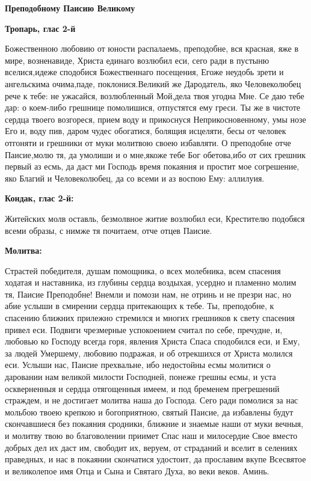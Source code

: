 \mychapterending

 


\bfseries Преподобному Паисию Великому\normalfont{}


\medskip


\bfseries Тропарь, глас 2-й\normalfont{}


Божественною любовию от юности распалаемь, преподобне, вся красная, яже в мире, возненавиде, Христа единаго возлюбил еси, сего ради в пустыню вселися,идеже сподобися Божественнаго посещения, Егоже неудобь зрети и ангельскима очима,паде, поклонися.Великий же Дародатель, яко Человеко­любец рече к тебе: не ужасайся, возлюб­ленный Мой,дела твоя угодна Мне. Се даю тебе дар: о коем-либо грешнице помолишися, отпустятся ему греси. Ты же в чистоте сердца твоего возгореся, прием воду и прикоснуся Неприкосно­венному, умы нозе Его и, воду пив, да­ром чудес обогатися, болящия исцеляти, бесы от человек отгоняти и грешни­ки от муки молитвою своею избавляти. О преподобне отче Паисие,молю тя, да умолиши и о мне,якоже тебе Бог обетова,ибо от сих грешник первый аз есмь, да даст ми Господь время покаяния и простит мое согрешение, яко Благий и Человеколюбец, да со всеми и аз воспою Ему: аллилуия.


\medskip


\bfseries Кондак, глас 2-й:\normalfont{}


Житейских молв оставль, безмолвное житие возлюбил еси, Крестителю подобяся всеми образы, с нимже тя почитаем, отче отцев Паисие.


\medskip


\bfseries Молитва:\normalfont{}


Страстей победителя, душам помощника, о всех молебника, всем спасения ходатая и наставника, из глубины сердца воздыхая, усердно и пламенно молим тя, Паисие Преподобне! Внемли и помози нам, не отринь и не презри нас, но абие услыши в смирении сердца притекающих к тебе. Ты, преподобне, к спасению ближних прилежно стремился и многих грешников к свету спасения привел еси. Подвиги чрезмерные успокоением считал по себе, пречудне, и, любовью ко Господу всегда горя, явления Христа Спаса сподобился еси, и Ему, за людей Умершему, любовию подражая, и об отрекшихся от Христа молился еси. Услыши нас, Паисие прехвальне, ибо недостойны есмы молитися о даровании нам великой милости Господней, понеже грешны есмы, и уста оскверненныя и сердца отягощенныя имеем, и под бременем прегрешений страждем, и не достигает молитва наша до Господа. Сего ради помолися за нас мольбою твоею крепкою и богоприятною, святый Паисие, да избавлены будут скончавшиеся без покаяния сродники, ближние и знаемые наши от муки вечныя, и молитву твою во благоволении приимет Спас наш и милосердие Свое вместо добрых дел их даст им, свободит их, веруем, от страданий и вселит в селениях праведных, и нас в покаянии скончатися удостоит, да прославим вкупе Всесвятое и великолепое имя Отца и Сына и Святаго Духа, во веки веков. Аминь.


